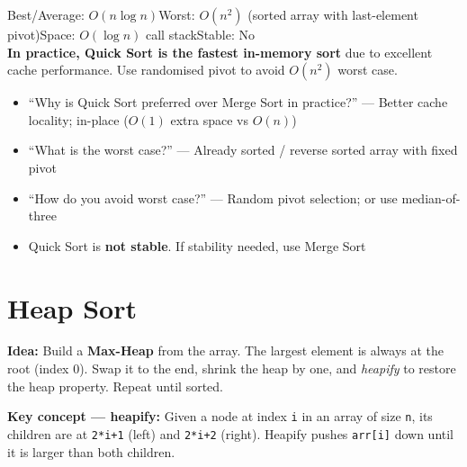 \documentclass[12pt,a4paper,oneside]{book}
\begin{document}
\begin{complexity}
Best/Average: $O(n \log n)$\quad Worst: $O(n^2)$ (sorted array with last-element pivot)\quad Space: $O(\log n)$ call stack\quad Stable: No\\[4pt]
\textbf{In practice, Quick Sort is the fastest in-memory sort} due to excellent cache performance. Use randomised pivot to avoid $O(n^2)$ worst case.
\end{complexity}

\begin{interviewcorner}
\begin{itemize}
  \item ``Why is Quick Sort preferred over Merge Sort in practice?'' --- Better cache locality; in-place ($O(1)$ extra space vs $O(n)$)
  \item ``What is the worst case?'' --- Already sorted / reverse sorted array with fixed pivot
  \item ``How do you avoid worst case?'' --- Random pivot selection; or use median-of-three
  \item Quick Sort is \textbf{not stable}. If stability needed, use Merge Sort
\end{itemize}
\end{interviewcorner}

\section{Heap Sort}

\textbf{Idea:} Build a \textbf{Max-Heap} from the array. The largest element is always at the root (index 0). Swap it to the end, shrink the heap by one, and \textit{heapify} to restore the heap property. Repeat until sorted.

\textbf{Key concept --- heapify:} Given a node at index \texttt{i} in an array of size \texttt{n}, its children are at \texttt{2*i+1} (left) and \texttt{2*i+2} (right). Heapify pushes \texttt{arr[i]} down until it is larger than both children.
\end{document}
